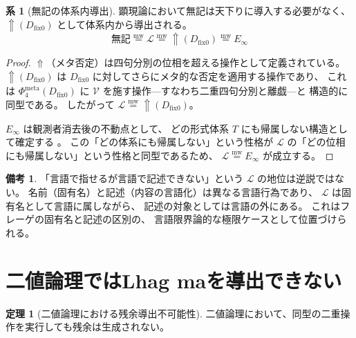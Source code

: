 \documentclass[11pt,a4paper]{article}
\theoremstyle{definition}
\newtheorem{theorem}{定理}[section]
\newtheorem{corollary}{系}[section]
\newtheorem{remark}{備考}[section]
\newcommand{\mweq}{\mathrel{\overset{\mathrm{mw}}{=}}}
\newcommand{\dfix}{D_{\mathrm{fix}0}}
\newcommand{\Einfty}{E_\infty}
\newcommand{\metanegation}{\Uparrow}
\newcommand{\Phimeta}{\Phi_{4}^{\mathrm{meta}}}
\begin{document}
\begin{corollary}[無記の体系内導出]
顕現論において無記は天下りに導入する必要がなく、
$\metanegation(\dfix)$ として体系内から導出される。
\begin{equation}
\text{無記} \mweq \mathcal{L} \mweq \metanegation(\dfix) \mweq \Einfty
\end{equation}
\end{corollary}

\begin{proof}
$\metanegation$（メタ否定）は四句分別の位相を超える操作として定義されている。
$\metanegation(\dfix)$ は $\dfix$ に対してさらにメタ的な否定を適用する操作であり、
これは $\Phimeta(\dfix)$ に $\mathcal{V}$ を施す操作---すなわち二重四句分別と離戯---と
構造的に同型である。
したがって $\mathcal{L} \mweq \metanegation(\dfix)$。

$\Einfty$ は観測者消去後の不動点として、
どの形式体系 $T$ にも帰属しない構造として確定する \cite{Chiba2026_einfty}。
この「どの体系にも帰属しない」という性格が
$\mathcal{L}$ の「どの位相にも帰属しない」という性格と同型であるため、
$\mathcal{L} \mweq \Einfty$ が成立する。
\end{proof}

\begin{remark}
「言語で指せるが言語で記述できない」という $\mathcal{L}$ の地位は逆説ではない。
名前（固有名）と記述（内容の言語化）は異なる言語行為であり、
$\mathcal{L}$ は固有名として言語に属しながら、
記述の対象としては言語の外にある。
これはフレーゲの固有名と記述の区別の、
言語限界論的な極限ケースとして位置づけられる。
\end{remark}

\section{二値論理ではLhag maを導出できない}

\begin{theorem}[二値論理における残余導出不可能性]
二値論理において、同型の二重操作を実行しても残余は生成されない。
\end{theorem}
\end{document}
